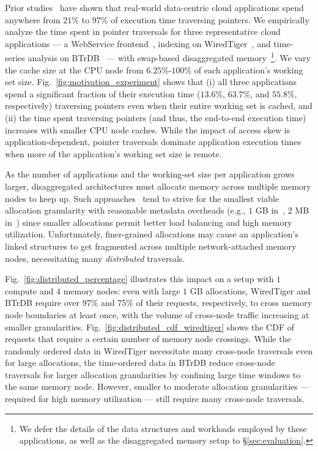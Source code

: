  Prior studies~\cite{graphchi, monetdb, spark, voltdb, memc3, db1000, memcached} have shown that real-world data-centric cloud applications spend anywhere from $21\%$ to $97\%$ of execution time traversing pointers. We empirically analyze the time spent in pointer traversals for three representative cloud applications --- a WebService frontend~\cite{aifm}, indexing on WiredTiger~\cite{wiredtiger}, and time-series analysis on BTrDB~\cite{btrdb} --- with swap-based disaggregated memory~\cite{infiniswap}\footnote{We defer the details of the data structures and workloads employed by these applications, as well as the disaggregated memory setup to \S\ref{sec:evaluation}.}. We vary the cache size at the CPU node from $6.25$\%-$100$\% of each application's working set size. Fig.~\ref{fig:motivation_experiment} shows that (i) all three applications spend a significant fraction of their execution time ($13.6$\%, $63.7$\%, and $55.8$\%, respectively) traversing pointers even when their entire working set is cached, and (ii) the time spent traversing pointers (and thus, the end-to-end execution time) increases with smaller CPU node caches. While the impact of access skew is application-dependent, pointer traversals dominate application execution times when more of the application's working set size is remote. 


 As the number of applications and the working-set size per application grows larger, disaggregated architectures must allocate memory across multiple memory nodes to keep up. Such approaches~\cite{legoos, mind, infiniswap, fastswap} tend to strive for the smallest viable allocation granularity with reasonable metadata overheads (e.g., $1$ GB in~\cite{legoos}, $2$ MB in~\cite{mind}) since smaller allocations permit better load balancing and high memory utilization. Unfortunately, finer-grained allocations may cause an application's linked structures to get fragmented across multiple network-attached memory nodes, necessitating many \emph{distributed} traversals. 

Fig.~\ref{fig:distributed_percentage} illustrates this impact on a setup with $1$ compute and $4$ memory nodes: even with large $1$ GB allocations, WiredTiger and BTrDB require over 97\% and 75\% of their requests, respectively, to cross memory node boundaries at least once, with the volume of cross-node traffic increasing at smaller granularities. Fig.~\ref{fig:distributed_cdf_wiredtiger} shows the CDF of requests that require a certain number of memory node crossings. While the randomly ordered data in WiredTiger necessitate many cross-node traversals even for large allocations, the time-ordered data in BTrDB reduce cross-node traversals for larger allocation granularities by confining large time windows to the same memory node. However, smaller to moderate allocation granularities --- required for high memory utilization --- still require many cross-node traversals. 

